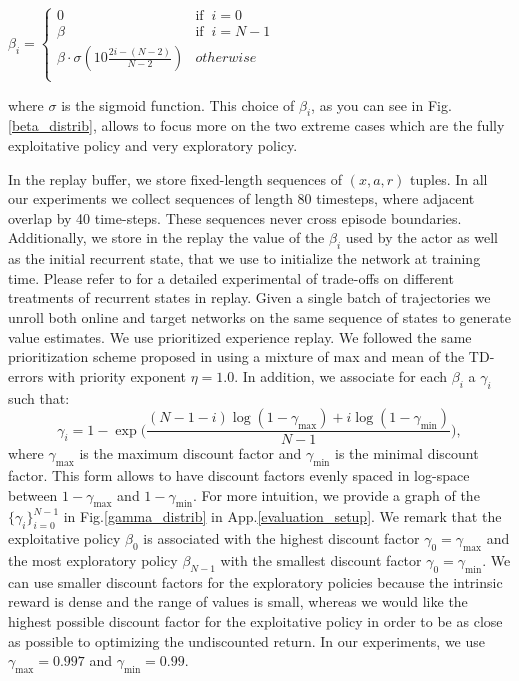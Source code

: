 \documentclass{article} %
\begin{document}
$\beta_i =
\left\{
	\begin{array}{ll}
		0  & \mbox{if }\ i = 0 \\
		\beta  & \mbox{if }\ i = N-1 \\
		\beta \cdot \sigma(10\frac{2i - (N-2)}{N-2}) & otherwise \\
	\end{array}
\right.$

where $\sigma$ is the sigmoid function. This choice of $\beta_i$, as you can see in Fig.\ref{beta_distrib}, allows to focus more on the two extreme cases which are the fully exploitative policy and very exploratory policy.

In the replay buffer, we store fixed-length sequences of $(x,a,r)$ tuples. In all our experiments we collect sequences of length 80 timesteps, where adjacent overlap by 40 time-steps. These sequences never cross episode boundaries. Additionally, we store in the replay the value of the $\beta_i$ used by the actor as well as the initial recurrent state, that we use to initialize the network at training time. Please refer to \citet{r2d2} for a detailed experimental of trade-offs on different treatments of recurrent states in replay.
%
Given a single batch of trajectories we unroll both online and target networks on the same sequence of states to generate value estimates.
%
We use prioritized experience replay. We followed the same prioritization scheme proposed in \citet{r2d2} using a mixture of max and mean of the TD-errors with priority exponent $\eta= 1.0$.
%
In addition, we associate for each $\beta_i$ a $\gamma_i$ such that:
\begin{equation}
\gamma_i = 1 - \exp\bigg(\frac{(N-1-i)\log(1-\gamma_{\max}) + i\log(1-\gamma_{\min})}{N-1}\bigg),
\end{equation}
where $\gamma_{\max}$ is the maximum discount factor and $\gamma_{\min}$ is the minimal discount factor. This form allows to have discount factors evenly spaced in log-space between $1-\gamma_{\max}$ and $1-\gamma_{\min}$. For more intuition, we provide a graph of the $\{\gamma_i\}_{i=0}^{N-1}$ in Fig.\ref{gamma_distrib} in App.\ref{evaluation_setup}.
We remark that the exploitative policy $\beta_0$ is associated with the highest discount factor $\gamma_0=\gamma_{\max}$ and the most exploratory policy $\beta_{N-1}$ with the smallest discount factor $\gamma_0=\gamma_{\min}$. We can use smaller discount factors for the exploratory policies because the intrinsic reward is dense and the range of values is small, whereas we would like the highest possible discount factor for the exploitative policy in order to be as close as possible to optimizing the undiscounted return.
In our experiments, we use $\gamma_{\max}=0.997$ and $\gamma_{\min}=0.99$.
\end{document}
